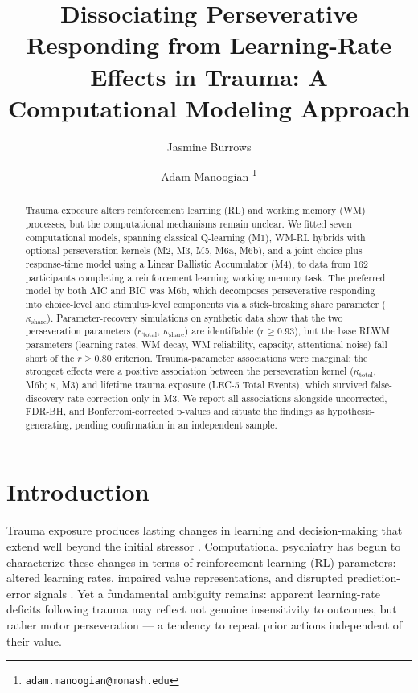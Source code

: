 \documentclass{article}
\title{Dissociating Perseverative Responding from Learning-Rate Effects
in Trauma: A Computational Modeling Approach}
\author[uts]{%
  Jasmine Burrows%
}
\author[mc3s,mbi,turner]{%
  \href{https://orcid.org/0009-0002-8002-3191}{\usebox{\orcidbox}\hspace{1mm}}%
  Adam Manoogian%
  \thanks{\texttt{adam.manoogian@monash.edu}}%
}
\affil[uts]{University of Technology Sydney}
\affil[mc3s]{Monash Centre for Consciousness and Contemplative Studies,
Monash University}
\affil[mbi]{Monash Biomedical Imaging, Monash University}
\affil[turner]{Turner Institute for Brain and Mental Health, Monash
University}
\begin{document}
\maketitle

\begin{abstract}
Trauma exposure alters reinforcement learning (RL) and working memory
(WM) processes, but the computational mechanisms remain unclear. We
fitted seven computational models, spanning classical Q-learning (M1),
WM-RL hybrids with optional perseveration kernels (M2, M3, M5, M6a,
M6b), and a joint choice-plus-response-time model using a Linear
Ballistic Accumulator (M4), to data from 162 participants completing a
reinforcement learning working memory task. The preferred model by both
AIC and BIC was M6b, which decomposes perseverative responding into
choice-level and stimulus-level components via a stick-breaking share
parameter (\(\kappa_{\text{share}}\)). Parameter-recovery simulations on
synthetic data show that the two perseveration parameters
(\(\kappa_{\text{total}}\), \(\kappa_{\text{share}}\)) are identifiable
(\(r \geq 0.93\)), but the base RLWM parameters (learning rates, WM
decay, WM reliability, capacity, attentional noise) fall short of the
\(r \geq 0.80\) criterion. Trauma-parameter associations were marginal:
the strongest effects were a positive association between the
perseveration kernel (\(\kappa_{\text{total}}\), M6b; \(\kappa\), M3)
and lifetime trauma exposure (LEC-5 Total Events), which survived
false-discovery-rate correction only in M3. We report all associations
alongside uncorrected, FDR-BH, and Bonferroni-corrected p-values and
situate the findings as hypothesis-generating, pending confirmation in
an independent sample.
\end{abstract}


\section{Introduction}\label{sec-intro}

Trauma exposure produces lasting changes in learning and decision-making
that extend well beyond the initial stressor
\citep{lissek2005classical, homan2019neural}. Computational psychiatry
has begun to characterize these changes in terms of reinforcement
learning (RL) parameters: altered learning rates, impaired value
representations, and disrupted prediction-error signals
\citep{browning2015anxious, gillan2016characterizing, millner2018pavlovian}.
Yet a fundamental ambiguity remains: apparent learning-rate deficits
following trauma may reflect not genuine insensitivity to outcomes, but
rather motor perseveration --- a tendency to repeat prior actions
independent of their value.
\end{document}
